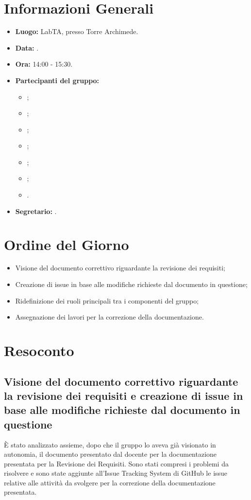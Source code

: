 \section{Informazioni Generali}
\begin{itemize}
\item \textbf{Luogo:} LabTA, presso Torre Archimede.
\item \textbf{Data:} \Data.
\item \textbf{Ora:} 14:00 - 15:30.
\item \textbf{Partecipanti del gruppo:}
	\begin{itemize}
		\item \AT{}; 
		\item \BR{};
		\item \CE{}; 
		\item \LD{};
		\item \MC{};
		\item \PF{};
		\item \SE{}.
	\end{itemize} 
\item \textbf{Segretario:} \CE{}.
\end{itemize}

\section{Ordine del Giorno}
\begin{itemize}
	\item Visione del documento correttivo riguardante la revisione dei requisiti;
	\item Creazione di issue in base alle modifiche richieste dal documento in questione;
	\item Ridefinizione dei ruoli principali tra i componenti del gruppo;
	\item Assegnazione dei lavori per la correzione della documentazione.
\end{itemize}


\section{Resoconto}

\subsection{Visione del documento correttivo riguardante la revisione dei requisiti e creazione di issue in base alle modifiche richieste dal documento in questione}
È stato analizzato assieme, dopo che il gruppo lo aveva già visionato in autonomia, il documento presentato dal docente per la documentazione presentata per la Revisione dei Requisiti.
Sono stati compresi i problemi da risolvere e sono state aggiunte all'Issue Tracking System di GitHub le issue relative alle attività da svolgere per la correzione della documentazione presentata.

